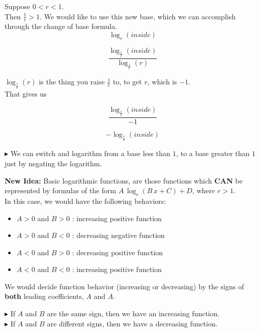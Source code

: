 \documentclass{ximera}
\begin{document}
Suppose $0 < r < 1$.\\

Then $\frac{1}{r} > 1$.  We would like to use this new base, which we can accomplish through the change of base formula.\\

\[
\log_r(inside)
\]


\[
\frac{\log_{\tfrac{1}{r}}(inside)}{\log_{\tfrac{1}{r}}(r)}
\]


$\log_{\tfrac{1}{r}}(r)$ is the thing you raise $\frac{1}{r}$ to, to get $r$, which is $-1$. \\


That gives us


\[
\frac{\log_{\tfrac{1}{r}}(inside)}{-1}
\]



\[
-\log_{\tfrac{1}{r}}(inside)
\]



\textbf{\textcolor{red!90!darkgray}{$\blacktriangleright$}} We can switch and logarithm from a base less than $1$, to a base greater than $1$ just by negating the logarithm.




\textbf{New Idea:} Basic logarithmic functions, are those functions which \textbf{\textcolor{red!80!black}{CAN}} be represented by formulas of the form $A \, \log_r(B \, x + C) + D$, where $r > 1$.  \\


In this case, we would have the following behaviors: \\


\begin{itemize}
\item $A > 0$ and $B > 0$ : increasing positive function
\item $A > 0$ and $B < 0$ : decreasing negative function  
\item $A < 0$ and $B > 0$ : decreasing positive function
\item $A < 0$ and $B < 0$ : increasing positive function 
\end{itemize}

We would decide function behavior (increasing or decreasing) by the signs of \textbf{both} leading coefficients, $A$ and $A$.

\textbf{\textcolor{red!90!darkgray}{$\blacktriangleright$}} If $A$ and $B$ are the same sign, then we have an increasing function. \\

\textbf{\textcolor{red!90!darkgray}{$\blacktriangleright$}} If $A$ and $B$ are different signs, then we have a decreasing function. \\
\end{document}
